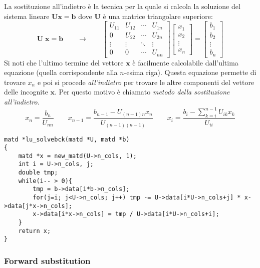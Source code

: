 \documentclass[10pt]{article}
\begin{document}
La sostituzione all'indietro è la tecnica per la quale si calcola la soluzione del sistema lineare $\mathbf{U}\mathbf{x}=\mathbf{b}$ dove $\mathbf{U}$ è una matrice triangolare superiore:
\begin{equation}
\mathbf{U} \; \mathbf{x} = \mathbf{b}
\qquad \rightarrow \qquad
\begin{bmatrix}
U_{11} & U_{12} & \cdots & U_{1n} \\
0      & U_{22} & \cdots & U_{2n} \\
\vdots & \vdots & \ddots & \vdots \\
0      & 0      & \cdots & U_{nn}
\end{bmatrix}
\begin{bmatrix}
x_1 \\ x_2 \\ \vdots \\ x_n
\end{bmatrix} = 
\begin{bmatrix}
b_1 \\ b_2 \\ \vdots \\ b_n
\end{bmatrix}
\end{equation}
Si noti che l'ultimo termine del vettore $\mathbf{x}$ è facilmente calcolabile dall'ultima equazione (quella corrispondente alla $n$-esima riga). Questa equazione permette di trovare $x_n$ e poi si procede \emph{all'indietro} per trovare le altre componenti del vettore delle incognite $\mathbf{x}$. Per questo motivo è chiamato \emph{metodo della sostituzione all'indietro}.
\begin{equation}
x_n = \frac{b_n}{U_{nn}} \qquad
x_{n-1} = \frac{b_{n-1} - U_{(n-1)n} x_n}{U_{(n-1)(n-1)}} \qquad
x_i = \frac{b_i - \sum_{k=i}^{n-1} U_{ik} x_k}{U_{ii}}
\end{equation}

\begin{lstlisting}
matd *lu_solvebck(matd *U, matd *b)
{
	matd *x = new_matd(U->n_cols, 1);
	int i = U->n_cols, j;
	double tmp;
	while(i-- > 0){
		tmp = b->data[i*b->n_cols];
		for(j=i; j<U->n_cols; j++) tmp -= U->data[i*U->n_cols+j] * x->data[j*x->n_cols];
		x->data[i*x->n_cols] = tmp / U->data[i*U->n_cols+i];
	}
	return x;
}
\end{lstlisting}


\subsubsection{Forward substitution}
\end{document}
